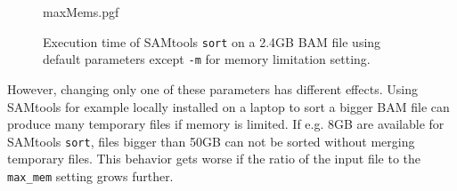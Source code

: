 \begin{figure}
        {maxMems.pgf}
    \caption{Execution time of SAMtools \texttt{sort} on a 2.4GB BAM file using default parameters except \texttt{-m} for memory limitation setting. }
    \label{fig:scaleMem}
\end{figure}
However, changing only one of these parameters has different effects. Using SAMtools for example locally installed on a laptop to sort a bigger BAM file can produce many temporary files if memory is limited. If e.g. 8GB are available for SAMtools \texttt{sort}, files bigger than 50GB can not be sorted without merging temporary files. This behavior gets worse if the ratio of the input file to the \texttt{max\_mem} setting grows further.